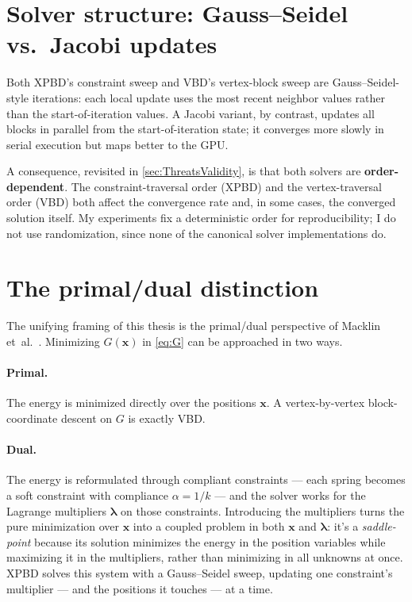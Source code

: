 \section{Solver structure: Gauss--Seidel vs.\ Jacobi updates}
\label{sec:GSJacobi}
Both XPBD's constraint sweep and VBD's vertex-block sweep are Gauss--Seidel-style
iterations: each local update uses the most recent neighbor values rather than
the start-of-iteration values. A Jacobi variant, by contrast, updates all blocks
in parallel from the start-of-iteration state; it converges more slowly in serial
execution but maps better to the GPU.

A consequence, revisited in \autoref{sec:ThreatsValidity}, is that both solvers
are \textbf{order-dependent}. The constraint-traversal order (XPBD) and the
vertex-traversal order (VBD) both affect the convergence rate and, in some
cases, the converged solution itself. My experiments fix a
deterministic order for reproducibility; I do not use randomization, since none
of the canonical solver implementations do.

\section{The primal/dual distinction}
\label{sec:PrimalDual}
The unifying framing of this thesis is the primal/dual perspective of Macklin
et~al.~\cite{10.1111/cgf.14104}. Minimizing $G(\mathbf{x})$ in \eqref{eq:G} can be
approached in two ways.

\paragraph{Primal.}
The energy is minimized directly over the positions $\mathbf{x}$. A
vertex-by-vertex block-coordinate descent on $G$ is exactly VBD.

\paragraph{Dual.}
The energy is reformulated through compliant constraints --- each spring becomes a
soft constraint with compliance $\alpha = 1/k$ --- and the solver works for the
Lagrange multipliers $\boldsymbol{\lambda}$ on those constraints. Introducing the
multipliers turns the pure minimization over $\mathbf{x}$ into a coupled problem
in both $\mathbf{x}$ and $\boldsymbol{\lambda}$: it's a \emph{saddle-point}
because its solution minimizes the energy in the position
variables while maximizing it in the multipliers, rather than minimizing in all
unknowns at once. XPBD solves this system with a Gauss--Seidel sweep, updating one
constraint's multiplier --- and the positions it touches --- at a time.

